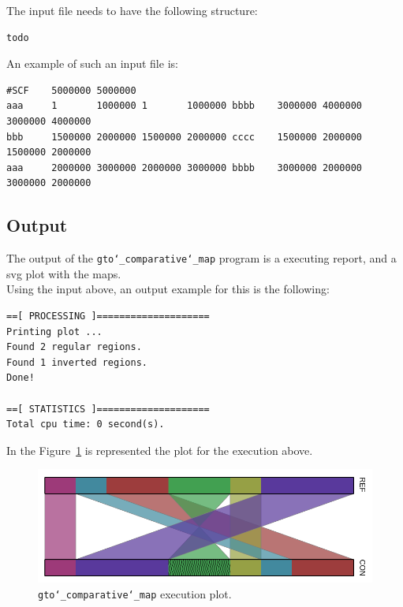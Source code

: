 The input file needs to have the following structure:
\begin{lstlisting}
todo
\end{lstlisting}
An example of such an input file is:
\begin{lstlisting}
#SCF    5000000 5000000
aaa     1       1000000 1       1000000 bbbb    3000000 4000000 3000000 4000000
bbb     1500000 2000000 1500000 2000000 cccc    1500000 2000000 1500000 2000000
aaa     2000000 3000000 2000000 3000000 bbbb    3000000 2000000 3000000 2000000
\end{lstlisting}

\subsection*{Output}
The output of the \texttt{gto\char`_comparative\char`_map} program is a executing report, and a svg plot with the maps.\\
Using the input above, an output example for this is the following:
\begin{lstlisting}
==[ PROCESSING ]====================
Printing plot ...
Found 2 regular regions. 
Found 1 inverted regions.
Done!                       

==[ STATISTICS ]====================
Total cpu time: 0 second(s).
\end{lstlisting}

In the Figure~\ref{fig:gtoComparativeMap} is represented the plot for the execution above.

 \begin{figure}[!h]
  \centering
  \includegraphics[scale=0.6]{./images/gto_comparative_map.png}
  \caption{\texttt{gto\char`_comparative\char`_map} execution plot.}
  \label{fig:gtoComparativeMap}
 \end{figure}